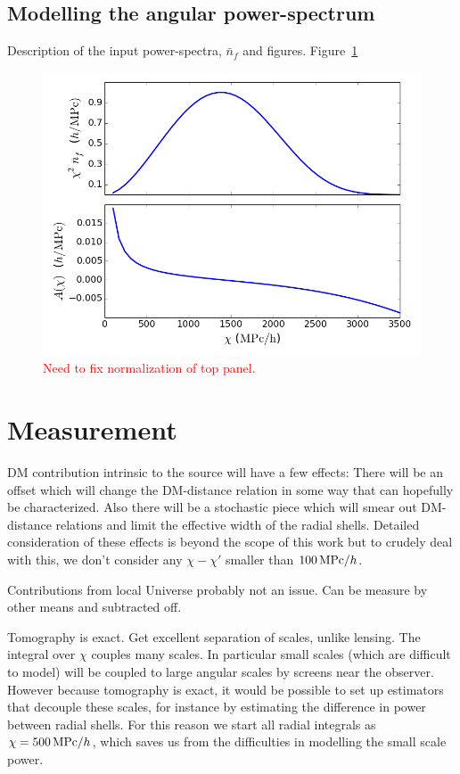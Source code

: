 \documentclass[twocolumn,prl,nofootinbib]{revtex4-1}
\newcommand{\red}{\textcolor{red}}
\begin{document}
\subsection{Modelling the angular power-spectrum}

Description of the input power-spectra, $\bar n_f$ and figures.
Figure~\ref{f:n_f}

\begin{figure}
    \includegraphics[scale=0.42]{"figures/n_f"}
    \caption{
        \label{f:n_f}
        \red{Need to fix normalization of top panel.}
    }
\end{figure}


\section{Measurement}


DM contribution intrinsic to the source will have a few effects: There will be
an offset which will change the DM-distance relation in some way that can
hopefully be characterized. Also there will be a stochastic piece which will
smear out DM-distance relations and limit the effective width of the radial
shells. Detailed consideration of these effects is beyond the scope of this
work but to crudely deal with this, we don't consider any $\chi - \chi'$
smaller than \red{$100\,{\rm MPc}/h$}.

Contributions from local Universe probably not an issue. Can be measure by
other means and subtracted off.

Tomography is exact.  Get excellent separation of scales, unlike lensing.
The integral over $\chi$ couples many scales. In particular small scales (which
are difficult to model) will
be coupled to large angular scales by screens near the observer.  However
because tomography is exact, it would be possible to set up estimators that
decouple these scales, for instance by estimating the difference in power
between radial shells.  For this reason we start all radial integrals as
$\chi = 500\,{\rm MPc}/h$, which saves us from the difficulties in modelling the
small scale power.
\end{document}
